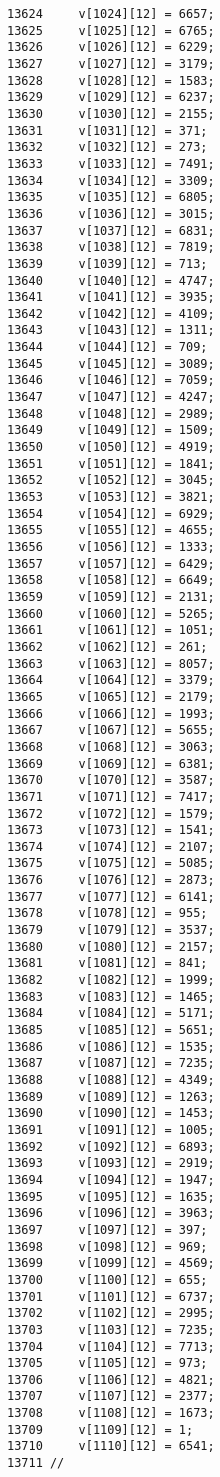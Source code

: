 \begin{Code}
\begin{verbatim}
13624     v[1024][12] = 6657;
13625     v[1025][12] = 6765;
13626     v[1026][12] = 6229;
13627     v[1027][12] = 3179;
13628     v[1028][12] = 1583;
13629     v[1029][12] = 6237;
13630     v[1030][12] = 2155;
13631     v[1031][12] = 371;
13632     v[1032][12] = 273;
13633     v[1033][12] = 7491;
13634     v[1034][12] = 3309;
13635     v[1035][12] = 6805;
13636     v[1036][12] = 3015;
13637     v[1037][12] = 6831;
13638     v[1038][12] = 7819;
13639     v[1039][12] = 713;
13640     v[1040][12] = 4747;
13641     v[1041][12] = 3935;
13642     v[1042][12] = 4109;
13643     v[1043][12] = 1311;
13644     v[1044][12] = 709;
13645     v[1045][12] = 3089;
13646     v[1046][12] = 7059;
13647     v[1047][12] = 4247;
13648     v[1048][12] = 2989;
13649     v[1049][12] = 1509;
13650     v[1050][12] = 4919;
13651     v[1051][12] = 1841;
13652     v[1052][12] = 3045;
13653     v[1053][12] = 3821;
13654     v[1054][12] = 6929;
13655     v[1055][12] = 4655;
13656     v[1056][12] = 1333;
13657     v[1057][12] = 6429;
13658     v[1058][12] = 6649;
13659     v[1059][12] = 2131;
13660     v[1060][12] = 5265;
13661     v[1061][12] = 1051;
13662     v[1062][12] = 261;
13663     v[1063][12] = 8057;
13664     v[1064][12] = 3379;
13665     v[1065][12] = 2179;
13666     v[1066][12] = 1993;
13667     v[1067][12] = 5655;
13668     v[1068][12] = 3063;
13669     v[1069][12] = 6381;
13670     v[1070][12] = 3587;
13671     v[1071][12] = 7417;
13672     v[1072][12] = 1579;
13673     v[1073][12] = 1541;
13674     v[1074][12] = 2107;
13675     v[1075][12] = 5085;
13676     v[1076][12] = 2873;
13677     v[1077][12] = 6141;
13678     v[1078][12] = 955;
13679     v[1079][12] = 3537;
13680     v[1080][12] = 2157;
13681     v[1081][12] = 841;
13682     v[1082][12] = 1999;
13683     v[1083][12] = 1465;
13684     v[1084][12] = 5171;
13685     v[1085][12] = 5651;
13686     v[1086][12] = 1535;
13687     v[1087][12] = 7235;
13688     v[1088][12] = 4349;
13689     v[1089][12] = 1263;
13690     v[1090][12] = 1453;
13691     v[1091][12] = 1005;
13692     v[1092][12] = 6893;
13693     v[1093][12] = 2919;
13694     v[1094][12] = 1947;
13695     v[1095][12] = 1635;
13696     v[1096][12] = 3963;
13697     v[1097][12] = 397;
13698     v[1098][12] = 969;
13699     v[1099][12] = 4569;
13700     v[1100][12] = 655;
13701     v[1101][12] = 6737;
13702     v[1102][12] = 2995;
13703     v[1103][12] = 7235;
13704     v[1104][12] = 7713;
13705     v[1105][12] = 973;
13706     v[1106][12] = 4821;
13707     v[1107][12] = 2377;
13708     v[1108][12] = 1673;
13709     v[1109][12] = 1;
13710     v[1110][12] = 6541;
13711 //

\end{verbatim}
\end{Code}
